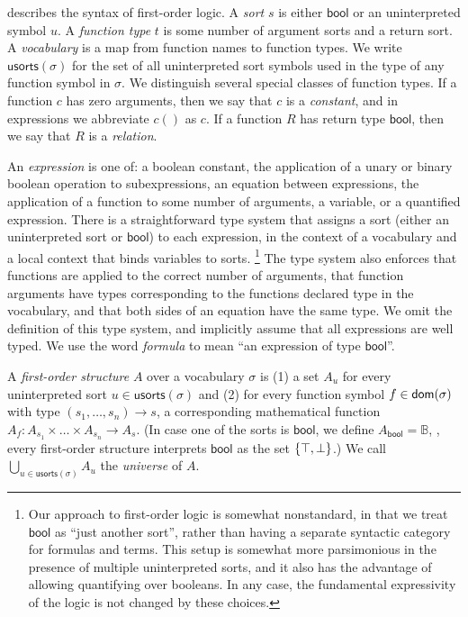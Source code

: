  describes the syntax of first-order logic.
A \emph{sort} $s$ is either $\mathsf{bool}$ or an uninterpreted symbol $u$.
A \emph{function type} $t$ is some number of argument sorts and a return sort.
A \emph{vocabulary} is a map from function names to function types.
We write $\mathsf{usorts}(\sigma)$ for the set of all uninterpreted sort
  symbols used in the type of any function symbol in $\sigma$.
We distinguish several special classes of function types.
If a function $c$ has zero arguments,
  then we say that $c$ is a \emph{constant},
  and in expressions we abbreviate $c()$ as $c$.
If a function $R$ has return type $\mathsf{bool}$,
  then we say that $R$ is a \emph{relation}.

An \emph{expression} is one of: a boolean constant,
  the application of a unary or binary boolean operation to subexpressions,
  an equation between expressions,
  the application of a function to some number of arguments,
  a variable,
  or a quantified expression.
There is a straightforward type system
  that assigns a sort (either an uninterpreted sort or $\mathsf{bool}$) to each expression,
  in the context of a vocabulary and a local context that binds variables to sorts.%
\footnote{Our approach to first-order logic is somewhat nonstandard,
in that we treat $\mathsf{bool}$ as ``just another sort'',
rather than having a separate syntactic category for formulas and terms.
This setup is somewhat more parsimonious in the presence of multiple uninterpreted sorts,
and it also has the advantage of allowing quantifying over booleans.
In any case, the fundamental expressivity of the logic is not changed by these choices.}
The type system also enforces that functions are applied to the correct number of arguments,
  that function arguments have types corresponding to the functions declared type in the vocabulary,
  and that both sides of an equation have the same type.
We omit the definition of this type system, and implicitly assume that all expressions are well typed.
We use the word \emph{formula} to mean ``an expression of type $\mathsf{bool}$''.

A \emph{first-order structure} $A$ over a vocabulary $\sigma$ is
 (1) a set $A_u$ for every uninterpreted sort $u\in\mathsf{usorts}(\sigma)$ and
 (2) for every function symbol $f\in\mathsf{dom}(\sigma)$
     with type $(s_1, \dots, s_n)\to s$,
     a corresponding mathematical function
     $A_f : A_{s_1} \times \dots \times A_{s_n} \to A_s$.
(In case one of the sorts is $\mathsf{bool}$, we define
  $A_{\mathsf{bool}} = \mathbb{B}$,
  \ie, every first-order structure interprets $\mathsf{bool}$
  as the set $\left\{{\top,\bot}\right\}$.)
We call $\bigcup_{u\in\mathsf{usorts}(\sigma)} A_u$ the \emph{universe} of $A$.

